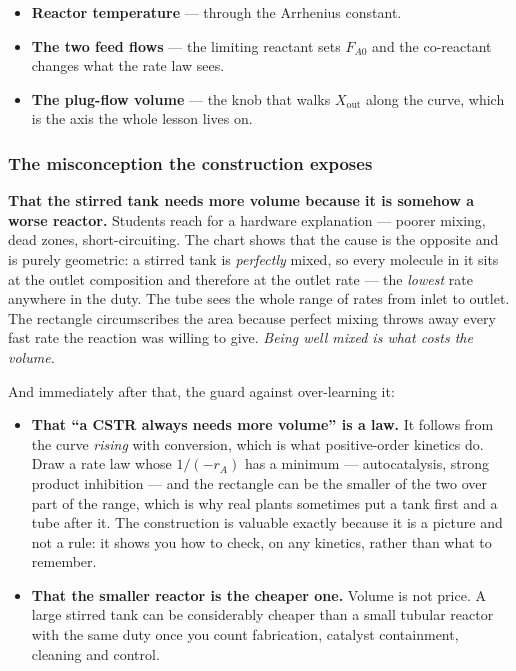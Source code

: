 \documentclass[11pt,a4paper]{article}
\begin{document}
\begin{itemize}[leftmargin=*,nosep]
  \item \textbf{Reactor temperature} --- through the Arrhenius constant.
  \item \textbf{The two feed flows} --- the limiting reactant sets
        $F_{A0}$ and the co-reactant changes what the rate law sees.
  \item \textbf{The plug-flow volume} --- the knob that walks
        $X_{\mathrm{out}}$ along the curve, which is the axis the whole
        lesson lives on.
\end{itemize}

\subsubsection*{The misconception the construction exposes}

\begin{pitfall}
\textbf{That the stirred tank needs more volume because it is somehow a
worse reactor.}  Students reach for a hardware explanation --- poorer
mixing, dead zones, short-circuiting.  The chart shows that the cause is
the opposite and is purely geometric: a stirred tank is \emph{perfectly}
mixed, so every molecule in it sits at the outlet composition and
therefore at the outlet rate --- the \emph{lowest} rate anywhere in the
duty.  The tube sees the whole range of rates from inlet to outlet.  The
rectangle circumscribes the area because perfect mixing throws away every
fast rate the reaction was willing to give.  \emph{Being well mixed is
what costs the volume.}
\end{pitfall}

And immediately after that, the guard against over-learning it:

\begin{itemize}[leftmargin=*,nosep,topsep=4pt]
  \item \textbf{That ``a CSTR always needs more volume'' is a law.}  It
        follows from the curve \emph{rising} with conversion, which is
        what positive-order kinetics do.  Draw a rate law whose
        $1/(-r_A)$ has a minimum --- autocatalysis, strong product
        inhibition --- and the rectangle can be the smaller of the two
        over part of the range, which is why real plants sometimes put a
        tank first and a tube after it.  The construction is valuable
        exactly because it is a picture and not a rule: it shows you how
        to check, on any kinetics, rather than what to remember.
  \item \textbf{That the smaller reactor is the cheaper one.}  Volume is
        not price.  A large stirred tank can be considerably cheaper than
        a small tubular reactor with the same duty once you count
        fabrication, catalyst containment, cleaning and control.
\end{itemize}
\end{document}
